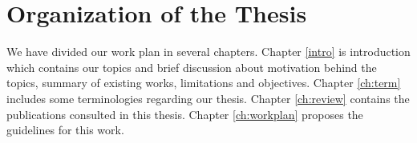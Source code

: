 \section{Organization of the Thesis}

We have divided our work plan in several chapters. Chapter \ref{intro} is introduction which contains our topics and brief discussion about motivation behind the topics, summary of existing works, limitations and objectives. Chapter \ref{ch:term} includes some terminologies regarding our thesis. Chapter \ref{ch:review} contains the publications consulted in this thesis. Chapter \ref{ch:workplan} proposes the guidelines for this work.



\endinput
